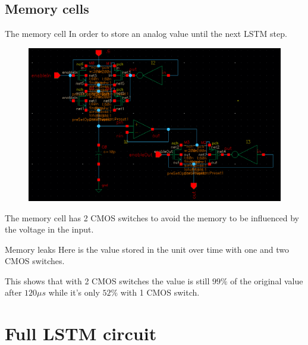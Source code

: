 \documentclass{beamer}
\begin{document}
  \subsection{Memory cells}
  \begin{frame}{The memory cell}
    In order to store an analog value until the next LSTM step.
    \begin{figure}
      \centering
      \includegraphics[height=0.5\textheight]{memcell/memcell-circuit.png}
    \end{figure}
    The memory cell has 2 CMOS switches to avoid the memory to be influenced by the voltage in the input.
  \end{frame}
  \begin{frame}{Memory leaks}
    Here is the value stored in the unit over time with one and two CMOS switches.
    \begin{figure}
      \centering
      \resizebox{!}{0.4\textheight}{}
    \end{figure}
    This shows that with 2 CMOS switches the value is still $99\%$ of the original value after $120 \mu s$ while it's only $52\%$ with 1 CMOS switch.
  \end{frame}



  \section{Full LSTM circuit}
\end{document}

